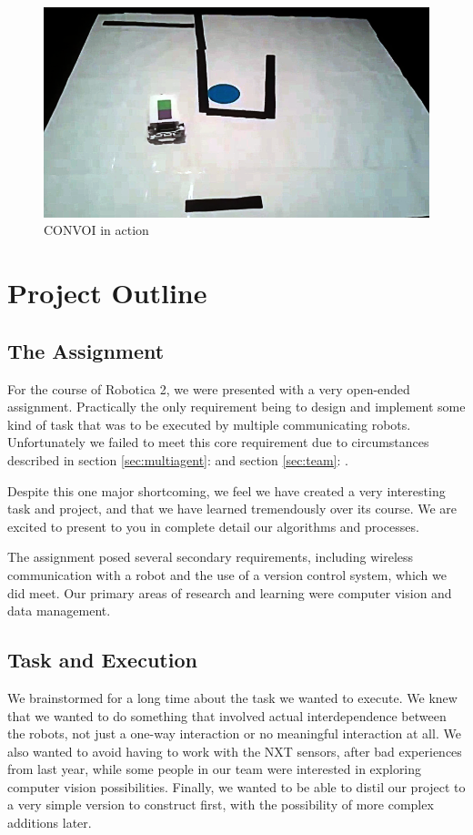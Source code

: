 \documentclass[10pt, abstracton]{scrartcl}
\newcommand{\sref}[1]{section \vref{#1}: \nameref{#1}}
\begin{document}
\begin{figure}
	\centering
	\includegraphics[width=\columnwidth]{pictures/photo1.png}
	\caption{\small CONVOI in action}
	\label{fig:photo1}
\end{figure}

\section{Project Outline}

\subsection{The Assignment}
For the course of Robotica 2, we were presented with a very open-ended assignment. Practically the only requirement being to design and implement some kind of task that was to be executed by multiple communicating robots. Unfortunately we failed to meet this core requirement due to circumstances described in \sref{sec:multiagent} and \sref{sec:team}.

Despite this one major shortcoming, we feel we have created a very interesting task and project, and that we have learned tremendously over its course. We are excited to present to you in complete detail our algorithms and processes.

The assignment posed several secondary requirements, including wireless communication with a robot and the use of a version control system, which we did meet. Our primary areas of research and learning were computer vision and data management.

\subsection{Task and Execution}
We brainstormed for a long time about the task we wanted to execute. We knew that we wanted to do something that involved actual interdependence between the robots, not just a one-way interaction or no meaningful interaction at all. We also wanted to avoid having to work with the NXT sensors, after bad experiences from last year, while some people in our team were interested in exploring computer vision possibilities. Finally, we wanted to be able to distil our project to a very simple version to construct first, with the possibility of more complex additions later.
\end{document}

